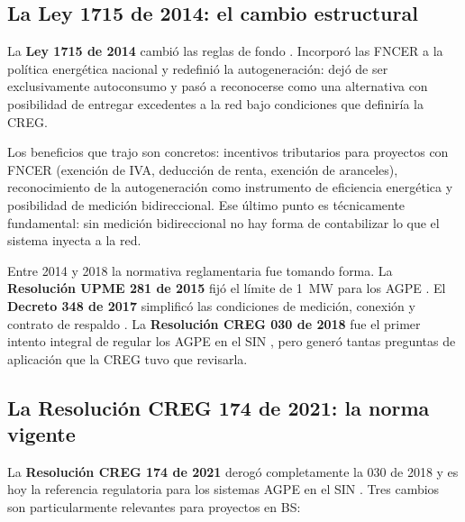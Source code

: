 \subsection{La Ley 1715 de 2014: el cambio estructural}
\label{subsec:ley1715}

La \textbf{Ley 1715 de 2014} cambió las reglas de fondo \parencite{Ley1715_2014}. Incorporó las FNCER a la política energética nacional y redefinió la autogeneración: dejó de ser exclusivamente autoconsumo y pasó a reconocerse como una alternativa con posibilidad de entregar excedentes a la red bajo condiciones que definiría la CREG.

Los beneficios que trajo son concretos: incentivos tributarios para proyectos con FNCER (exención de IVA, deducción de renta, exención de aranceles), reconocimiento de la autogeneración como instrumento de eficiencia energética y posibilidad de medición bidireccional. Ese último punto es técnicamente fundamental: sin medición bidireccional no hay forma de contabilizar lo que el sistema inyecta a la red.

Entre 2014 y 2018 la normativa reglamentaria fue tomando forma. La \textbf{Resolución UPME 281 de 2015} fijó el límite de 1~MW para los AGPE \parencite{ResolucionUPME281_2015}. El \textbf{Decreto 348 de 2017} simplificó las condiciones de medición, conexión y contrato de respaldo \parencite{Decreto348_2017}. La \textbf{Resolución CREG 030 de 2018} fue el primer intento integral de regular los AGPE en el SIN \parencite{ResolucionCREG030_2018}, pero generó tantas preguntas de aplicación que la CREG tuvo que revisarla.

\subsection{La Resolución CREG 174 de 2021: la norma vigente}
\label{subsec:resolucion174}

La \textbf{Resolución CREG 174 de 2021} derogó completamente la 030 de 2018 y es hoy la referencia regulatoria para los sistemas AGPE en el SIN \parencite{ResolucionCREG174_2021}. Tres cambios son particularmente relevantes para proyectos en BS:

